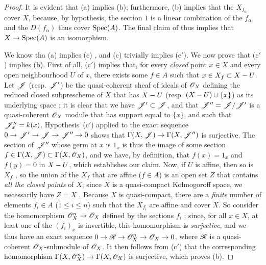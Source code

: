 \begin{proof}
\label{proof-II.5.2.1}
It is evident that (a) implies (b); furthermore, (b) implies that the $X_{f_\alpha}$ cover $X$, because, by hypothesis, the section $1$ is a linear combination of the $f_\alpha$, and the $D(f_\alpha)$ thus cover $\operatorname{Spec}(A)$.
The final claim of  thus implies that $X\to\Spec(A)$ is an isomorphism.

We know tha (a) implies (c) , and (c) trivially implies (c$'$).
We now prove that (c$'$) implies (b).
First of all, (c$'$) implies that, for every \emph{closed} point $x\in X$ and every open neighbourhood $U$ of $x$, there exists some $f\in A$ such that $x\in X_f\subset X- U$.
Let $\mathscr{J}$ (resp. $\mathscr{J}'$) be the quasi-coherent sheaf of ideals of $\mathscr{O}_X$ defining the reduced closed subprescheme of $X$ that has $X- U$ (resp. $(X- U)\cup\{x\}$) as its underlying space ;
it is clear that we have $\mathscr{J}'\subset\mathscr{J}$, and that $\mathscr{J}''=\mathscr{J}/\mathscr{J}'$ is a quasi-coherent $\mathscr{O}_X$ module that has support equal to $\{x\}$, and such that $\mathscr{J}_x''=k(x)$.
Hypothesis~(c$'$) applied to the exact sequence $0\to\sh{J}'\to\sh{J}\to\sh{J}''\to0$ shows that $\Gamma(X,\sh{J})\to\Gamma(X,\sh{J}'')$ is surjective.
The section of $\mathscr{J}''$ whose germ at $x$ is $1_x$ is thus the image of some section $f\in\Gamma(X,\mathscr{J})\subset\Gamma(X,\mathscr{O}_X)$, and we have, by definition, that $f(x)=1_x$ and $f(y)=0$ in $X- U$, which establishes our claim.
Now, if $U$ is affine, then so is $X_f$ , so the union of the $X_f$ that are affine ($f\in A$) is an open set $Z$ that contains \emph{all the closed points} of $X$;
since $X$ is a quasi-compact Kolmogoroff space, we necessarily have $Z=X$ .
Because $X$ is quasi-compact, there are a \emph{finite} number of elements $f_i\in A$ ($1\leq i\leq n$) such that the $X_{f_i}$ are affine and cover $X$.
So consider the homomorphism $\sh{O}_X^n\to\sh{O}_X$ defined by the sections $f_i$ ;
since, for all $x\in X$, at least one of the $(f_i)_x$ is invertible, this homomorphism is \emph{surjective}, and we thus have an exact sequence $0\to\sh{R}\to\sh{O}_X^n\to\sh{O}_X\to0$, where $\mathscr{R}$ is a quasi-coherent $\mathscr{O}_X$-submodule of $\mathscr{O}_X$.
It then follows
from (c$'$) that the corresponding homomorphism $\Gamma(X,\sh{O}_X^n)\to\Gamma(X,\sh{O}_X)$ is surjective, which proves (b).


\end{proof}
